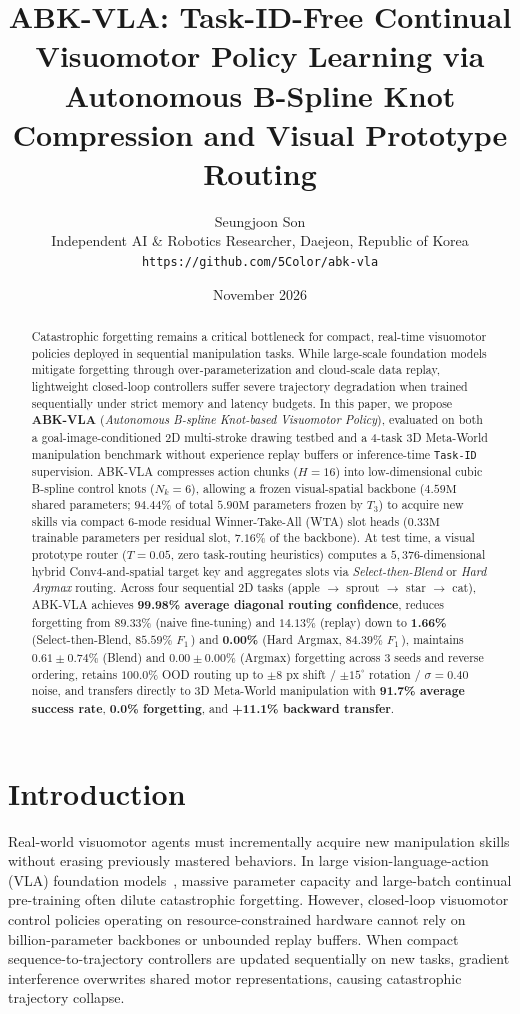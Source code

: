 \documentclass[10pt,twocolumn]{article}
\title{\textbf{ABK-VLA: Task-ID-Free Continual Visuomotor Policy Learning via Autonomous B-Spline Knot Compression and Visual Prototype Routing}}
\author{
  Seungjoon Son \\
  Independent AI \& Robotics Researcher, Daejeon, Republic of Korea \\
  \texttt{https://github.com/5Color/abk-vla}
}
\date{November 2026}
\begin{document}
\maketitle

\begin{abstract}
Catastrophic forgetting remains a critical bottleneck for compact, real-time visuomotor policies deployed in sequential manipulation tasks. While large-scale foundation models mitigate forgetting through over-parameterization and cloud-scale data replay, lightweight closed-loop controllers suffer severe trajectory degradation when trained sequentially under strict memory and latency budgets. In this paper, we propose \textbf{ABK-VLA} (\textit{Autonomous B-spline Knot-based Visuomotor Policy}), evaluated on both a goal-image-conditioned 2D multi-stroke drawing testbed and a 4-task 3D Meta-World manipulation benchmark without experience replay buffers or inference-time \texttt{Task-ID} supervision. ABK-VLA compresses action chunks ($H=16$) into low-dimensional cubic B-spline control knots ($N_k=6$), allowing a frozen visual-spatial backbone ($4.59\text{M}$ shared parameters; $94.44\%$ of total $5.90\text{M}$ parameters frozen by $T_3$) to acquire new skills via compact 6-mode residual Winner-Take-All (WTA) slot heads ($0.33\text{M}$ trainable parameters per residual slot, $7.16\%$ of the backbone). At test time, a visual prototype router ($T=0.05$, zero task-routing heuristics) computes a $5{,}376$-dimensional hybrid Conv4-and-spatial target key and aggregates slots via \textit{Select-then-Blend} or \textit{Hard Argmax} routing. Across four sequential 2D tasks (apple $\to$ sprout $\to$ star $\to$ cat), ABK-VLA achieves \textbf{99.98\% average diagonal routing confidence}, reduces forgetting from $89.33\%$ (naive fine-tuning) and $14.13\%$ (replay) down to \textbf{1.66\%} (Select-then-Blend, $85.59\%$ $F_1$\,) and \textbf{0.00\%} (Hard Argmax, $84.39\%$ $F_1$\,), maintains $0.61\pm 0.74\%$ (Blend) and $0.00\pm 0.00\%$ (Argmax) forgetting across 3 seeds and reverse ordering, retains $100.0\%$ OOD routing up to $\pm 8\text{ px}$ shift / $\pm 15^\circ$ rotation / $\sigma=0.40$ noise, and transfers directly to 3D Meta-World manipulation with \textbf{91.7\% average success rate}, \textbf{0.0\% forgetting}, and \textbf{+11.1\% backward transfer}.
\end{abstract}

\section{Introduction}
Real-world visuomotor agents must incrementally acquire new manipulation skills without erasing previously mastered behaviors. In large vision-language-action (VLA) foundation models~\cite{kim2024openvla}, massive parameter capacity and large-batch continual pre-training often dilute catastrophic forgetting. However, closed-loop visuomotor control policies operating on resource-constrained hardware cannot rely on billion-parameter backbones or unbounded replay buffers. When compact sequence-to-trajectory controllers are updated sequentially on new tasks, gradient interference overwrites shared motor representations, causing catastrophic trajectory collapse.
\end{document}
